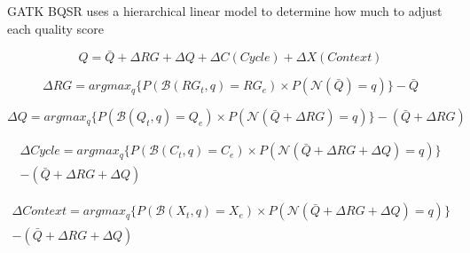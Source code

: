 \documentclass[table]{beamer}
\begin{document}
\begin{frame}{GATK BQSR uses a hierarchical linear model to determine how much to adjust each quality score}

\begin{displaymath}
Q = \bar{Q} + \Delta RG + \Delta{} Q + \Delta{} C (Cycle) + \Delta{} X (Context)
\end{displaymath}

\begin{displaymath}
\Delta{}RG = argmax_{q}\{P(\mathcal{B}(RG_{t},q) = RG_{e}) \times P(\mathcal{N}(\bar{Q}) = q)\} - \bar{Q}
\end{displaymath}

\begin{displaymath}
\Delta Q = argmax_{q}\{P(\mathcal{B}(Q_{t},q) = Q_{e}) \times P(\mathcal{N}(\bar{Q} + \Delta RG) = q)\} - (\bar{Q} + \Delta RG)
\end{displaymath}

\begin{multline}
\Delta Cycle = argmax_{q}\{P(\mathcal{B}(C_{t},q) = C_{e}) \times P(\mathcal{N}(\bar{Q} + \Delta RG + \Delta Q) = q)\} \\ - (\bar{Q} + \Delta RG + \Delta Q)
\end{multline}

\begin{multline}
\Delta Context = argmax_{q}\{P(\mathcal{B}(X_{t},q) = X_{e}) \times P(\mathcal{N}(\bar{Q} + \Delta RG + \Delta Q) = q)\} \\ - (\bar{Q} + \Delta RG + \Delta Q)
\end{multline}

\end{frame}
\end{document}
